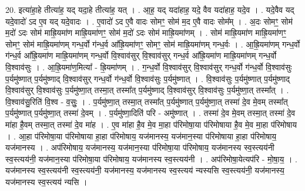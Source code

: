 \documentclass[17pt]{extarticle}
\begin{document}
20. इत्या॑हा॒हे तीत्या॑ह॒ यद् यदा॒हे तीत्या॑ह॒ यत् । . आ॒ह॒ यद् यदा॑हाह॒ यदे॒ वैव यदा॑हाह॒ यदे॒व । . यदे॒वैव यद् यदे॒वादो॑ ऽद ए॒व यद् यदे॒वादः । . ए॒वादो॑ ऽद ए॒वै वादः सोमꣳ॒॒ सोम॑ म॒द ए॒वै वादः सोम᳚म् । . अ॒दः सोमꣳ॒॒ सोम॑ म॒दो॑ ऽदः सोम॑ माह्रि॒यमा॑ण माह्रि॒यमा॑णꣳ॒॒ सोम॑ म॒दो॑ ऽदः सोम॑ माह्रि॒यमा॑णम् । . सोम॑ माह्रि॒यमा॑ण माह्रि॒यमा॑णꣳ॒॒ सोमꣳ॒॒ सोम॑ माह्रि॒यमा॑णम् गन्ध॒र्वो ग॑न्ध॒र्व आ᳚ह्रि॒यमा॑णꣳ॒॒ सोमꣳ॒॒ सोम॑ माह्रि॒यमा॑णम् गन्ध॒र्वः । . आ॒ह्रि॒यमा॑णम् गन्ध॒र्वो ग॑न्ध॒र्व आ᳚ह्रि॒यमा॑ण माह्रि॒यमा॑णम् गन्ध॒र्वो वि॒श्वाव॑सुर् वि॒श्वाव॑सुर् गन्ध॒र्व आ᳚ह्रि॒यमा॑ण माह्रि॒यमा॑णम् गन्ध॒र्वो वि॒श्वाव॑सुः । . आ॒ह्रि॒यमा॑ण॒मित्या᳚ - ह्रि॒यमा॑णम् । . ग॒न्ध॒र्वो वि॒श्वाव॑सुर् वि॒श्वाव॑सुर् गन्ध॒र्वो ग॑न्ध॒र्वो वि॒श्वाव॑सुः प॒र्यमु॑ष्णात् प॒र्यमु॑ष्णाद् वि॒श्वाव॑सुर् गन्ध॒र्वो ग॑न्ध॒र्वो वि॒श्वाव॑सुः प॒र्यमु॑ष्णात् । . वि॒श्वाव॑सुः प॒र्यमु॑ष्णात् प॒र्यमु॑ष्णाद् वि॒श्वाव॑सुर् वि॒श्वाव॑सुः प॒र्यमु॑ष्णा॒त् तस्मा॒त् तस्मा᳚त् प॒र्यमु॑ष्णाद् वि॒श्वाव॑सुर् वि॒श्वाव॑सुः प॒र्यमु॑ष्णा॒त् तस्मा᳚त् । . वि॒श्वाव॑सु॒रिति॑ वि॒श्व - व॒सुः॒ । . प॒र्यमु॑ष्णा॒त् तस्मा॒त् तस्मा᳚त् प॒र्यमु॑ष्णात् प॒र्यमु॑ष्णा॒त् तस्मा॑ दे॒व मे॒वम् तस्मा᳚त् प॒र्यमु॑ष्णात् प॒र्यमु॑ष्णा॒त् तस्मा॑ दे॒वम् । . प॒र्यमु॑ष्णा॒दिति॑ परि - अमु॑ष्णात् । . तस्मा॑ दे॒व मे॒वम् तस्मा॒त् तस्मा॑ दे॒व मा॑हा है॒वम् तस्मा॒त् तस्मा॑ दे॒व मा॑ह । . ए॒व मा॑हा है॒व मे॒व मा॒हा प॑रिमोषा॒या प॑रिमोषाया है॒व मे॒व मा॒हा प॑रिमोषाय । . आ॒हा प॑रिमोषा॒या प॑रिमोषाया हा॒हा प॑रिमोषाय॒ यज॑मानस्य॒ यज॑मान॒स्या प॑रिमोषाया हा॒हा प॑रिमोषाय॒ यज॑मानस्य । . अप॑रिमोषाय॒ यज॑मानस्य॒ यज॑मान॒स्या प॑रिमोषा॒या प॑रिमोषाय॒ यज॑मानस्य स्व॒स्त्यय॑नी स्व॒स्त्यय॑नी॒ यज॑मान॒स्या प॑रिमोषा॒या प॑रिमोषाय॒ यज॑मानस्य स्व॒स्त्यय॑नी । . अप॑रिमोषा॒येत्यप॑रि - मो॒षा॒य॒ । . यज॑मानस्य स्व॒स्त्यय॑नी स्व॒स्त्यय॑नी॒ यज॑मानस्य॒ यज॑मानस्य स्व॒स्त्यय॑ न्यस्यसि स्व॒स्त्यय॑नी॒ यज॑मानस्य॒ यज॑मानस्य स्व॒स्त्यय॑ न्यसि । \newline
\end{document}
